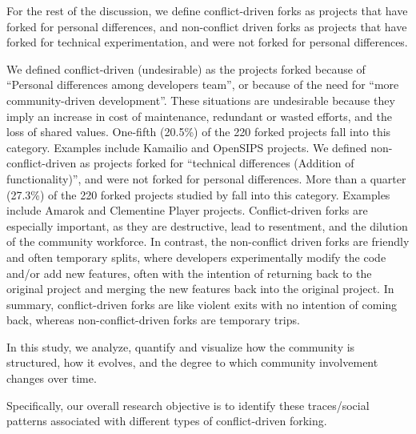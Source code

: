 \documentclass[12pt,letterpaper]{gthesis2}  %
\begin{document}


For the rest of the discussion, we define conflict-driven forks as projects that have forked for personal differences, and non-conflict driven forks as projects that have forked for technical experimentation, and were not forked for personal differences. 

We defined conflict-driven (undesirable) as the projects forked because of ``Personal differences among developers team'', or because of the need for ``more community-driven development''. These situations are undesirable because they imply an increase in cost of maintenance, redundant or wasted efforts, and the loss of shared values. One-fifth (20.5\%) of the 220 forked projects fall into this category\cite{Robles}. Examples include Kamailio and OpenSIPS projects. We defined non-conflict-driven as projects forked for ``technical differences (Addition of functionality)'', and were not forked for personal differences. More than a quarter (27.3\%) of the 220 forked projects studied by \cite{Robles} fall into this category. Examples include Amarok and Clementine Player projects.
Conflict-driven forks are especially important, as they are destructive, lead to resentment, and the dilution of the community workforce. In contrast, the non-conflict driven forks are friendly and often temporary splits, where developers experimentally modify the code and/or add new features, often with the intention of returning back to the original project and merging the new features back into the original project. In summary, conflict-driven forks are like violent exits with no intention of coming back, whereas non-conflict-driven forks are temporary trips. 

In this study, we analyze, quantify and visualize how the community is structured, how it evolves, and the degree to which community involvement changes over time. 

Specifically, our overall research objective is to identify these traces/social patterns associated with different types of conflict-driven forking. 
\end{document}
